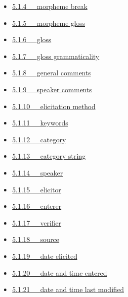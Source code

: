 \documentclass[letterpaper,10pt,english]{sphinxmanual}
\begin{document}
{\begin{minipage}{0.95\linewidth}
\begin{itemize}
\begin{itemize}
\begin{itemize}
\item {} 
{\hyperref[user_guide:morpheme-break]{5.1.4   morpheme break}}

\item {} 
{\hyperref[user_guide:morpheme-gloss]{5.1.5   morpheme gloss}}

\item {} 
{\hyperref[user_guide:gloss]{5.1.6   gloss}}

\item {} 
{\hyperref[user_guide:gloss-grammaticality]{5.1.7   gloss grammaticality}}

\item {} 
{\hyperref[user_guide:general-comments]{5.1.8   general comments}}

\item {} 
{\hyperref[user_guide:speaker-comments]{5.1.9   speaker comments}}

\item {} 
{\hyperref[user_guide:elicitation-method]{5.1.10   elicitation method}}

\item {} 
{\hyperref[user_guide:keywords]{5.1.11   keywords}}

\item {} 
{\hyperref[user_guide:category]{5.1.12   category}}

\item {} 
{\hyperref[user_guide:category-string]{5.1.13   category string}}

\item {} 
{\hyperref[user_guide:speaker]{5.1.14   speaker}}

\item {} 
{\hyperref[user_guide:elicitor]{5.1.15   elicitor}}

\item {} 
{\hyperref[user_guide:enterer]{5.1.16   enterer}}

\item {} 
{\hyperref[user_guide:verifier]{5.1.17   verifier}}

\item {} 
{\hyperref[user_guide:source]{5.1.18   source}}

\item {} 
{\hyperref[user_guide:date-elicited]{5.1.19   date elicited}}

\item {} 
{\hyperref[user_guide:date-and-time-entered]{5.1.20   date and time entered}}

\item {} 
{\hyperref[user_guide:date-and-time-last-modified]{5.1.21   date and time last modified}}


\end{itemize}
\end{itemize}
\end{itemize}
\end{minipage}}
\end{document}
